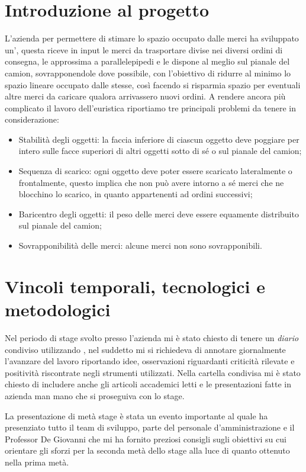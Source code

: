 \section{Introduzione al progetto}
L'azienda per permettere di stimare lo spazio occupato dalle merci ha sviluppato un', questa riceve in input le merci da trasportare divise nei diversi ordini di consegna, le approssima a parallelepipedi e le dispone al meglio sul pianale del camion, sovrapponendole dove possibile, con l'obiettivo di ridurre al minimo lo spazio lineare occupato dalle stesse, così facendo si risparmia spazio per eventuali altre merci da caricare qualora arrivassero nuovi ordini.
A rendere ancora più complicato il lavoro dell'euristica riportiamo tre principali problemi da tenere in considerazione:
\begin{itemize}
	\item Stabilità degli oggetti: la faccia inferiore di ciascun oggetto deve poggiare per intero sulle facce superiori di altri oggetti sotto di sé o sul pianale del camion;
	\item Sequenza di scarico: ogni oggetto deve poter essere scaricato lateralmente o frontalmente, questo implica che non può avere intorno a sé merci che ne blocchino lo scarico, in quanto appartenenti ad ordini successivi;
	\item Baricentro degli oggetti: il peso delle merci deve essere equamente distribuito sul pianale del camion;
	\item Sovrapponibilità delle merci: alcune merci non sono sovrapponibili.
\end{itemize}

\section{Vincoli temporali, tecnologici e metodologici}
Nel periodo di stage svolto presso l'azienda mi è stato chiesto di tenere un \textit{diario} condiviso utilizzando , nel suddetto mi si richiedeva di annotare giornalmente l'avanzare del lavoro riportando idee, osservazioni riguardanti criticità rilevate e positività riscontrate negli strumenti utilizzati. Nella cartella condivisa mi è stato chiesto di includere anche gli articoli accademici letti e le presentazioni fatte in azienda man mano che si proseguiva con lo stage.

La presentazione di metà stage è stata un evento importante al quale ha presenziato tutto il team di sviluppo, parte del personale d'amministrazione e il Professor De Giovanni che mi ha fornito preziosi consigli sugli obiettivi su cui orientare gli sforzi per la seconda metà dello stage alla luce di quanto ottenuto nella prima metà.

